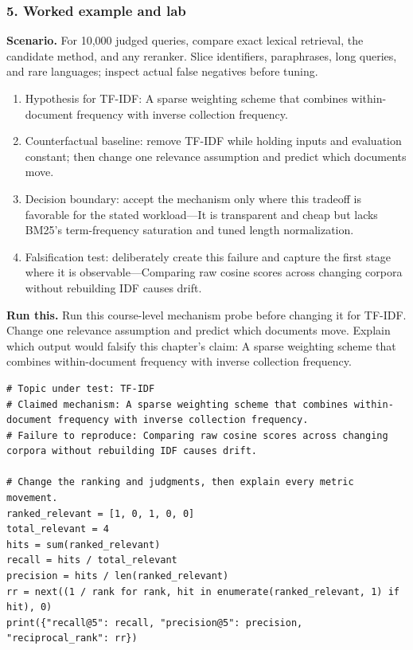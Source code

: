 \subsubsection*{5. Worked example and lab}
\textbf{Scenario.} For 10,000 judged queries, compare exact lexical retrieval, the candidate method, and any reranker. Slice identifiers, paraphrases, long queries, and rare languages; inspect actual false negatives before tuning.
\begin{enumerate}
\item Hypothesis for TF-IDF: A sparse weighting scheme that combines within-document frequency with inverse collection frequency.
\item Counterfactual baseline: remove TF-IDF while holding inputs and evaluation constant; then change one relevance assumption and predict which documents move.
\item Decision boundary: accept the mechanism only where this tradeoff is favorable for the stated workload—It is transparent and cheap but lacks BM25's term-frequency saturation and tuned length normalization.
\item Falsification test: deliberately create this failure and capture the first stage where it is observable—Comparing raw cosine scores across changing corpora without rebuilding IDF causes drift.
\end{enumerate}
\textbf{Run this.} Run this course-level mechanism probe before changing it for TF-IDF. Change one relevance assumption and predict which documents move. Explain which output would falsify this chapter's claim: A sparse weighting scheme that combines within-document frequency with inverse collection frequency.
\begin{Verbatim}[fontsize=\scriptsize]
# Topic under test: TF-IDF
# Claimed mechanism: A sparse weighting scheme that combines within-document frequency with inverse collection frequency.
# Failure to reproduce: Comparing raw cosine scores across changing corpora without rebuilding IDF causes drift.

# Change the ranking and judgments, then explain every metric movement.
ranked_relevant = [1, 0, 1, 0, 0]
total_relevant = 4
hits = sum(ranked_relevant)
recall = hits / total_relevant
precision = hits / len(ranked_relevant)
rr = next((1 / rank for rank, hit in enumerate(ranked_relevant, 1) if hit), 0)
print({"recall@5": recall, "precision@5": precision, "reciprocal_rank": rr})
\end{Verbatim}
